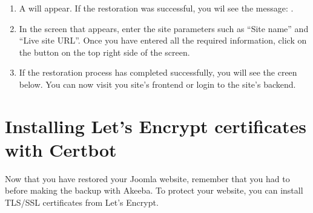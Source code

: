 \documentclass[a4paper,10pt,english,openany,oneside]{sphinxmanual}
\begin{document}
\begin{enumerate}
\begin{figure}[H]
\noindent{}
\end{figure}

\item {} 
\sphinxAtStartPar
A  will appear. If the restoration was successful, you wil see the message: .
\begin{quote}

\begin{figure}[H]
\centering

\noindent{}
\end{figure}

\newpage
\end{quote}

\item {} 
\sphinxAtStartPar
In the screen that appears, enter the site parameters such as “Site name” and “Live site URL”. Once you have entered all the required information, click on the button  on the top right side of the screen.
\begin{quote}

\begin{figure}[H]
\centering

\noindent{}
\end{figure}
\end{quote}

\item {} 
\sphinxAtStartPar
If the restoration process has completed successfully, you will see the creen below. You can now visit you site’s frontend or login to the site’s backend.
\begin{quote}

\begin{figure}[H]
\centering

\noindent{}
\end{figure}
\end{quote}

\end{enumerate}


\section{Installing Let’s Encrypt certificates with Certbot}
\label{\detokenize{joomla-to-vps:installing-let-s-encrypt-certificates-with-certbot}}
\sphinxAtStartPar
Now that you have restored your Joomla website, remember that you had to {\hyperref[\detokenize{joomla-to-vps:disable-ssl}]{}} before making the backup with Akeeba.
To protect your website, you can install TLS/SSL certificates from Let’s Encrypt.
\end{document}
